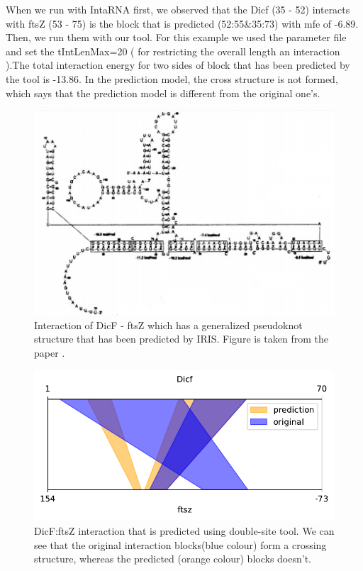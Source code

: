 \documentclass[twoside,a4paper]{report}
\numberwithin{equation}{section}
\begin{document}
	When we run with IntaRNA first, we observed that the Dicf (35 - 52) interacts with ftsZ (53 - 75) is the block that is predicted (52:55\&35:73) with mfe of -6.89. Then, we run them with our tool. For this example we used the parameter file and set the tIntLenMax=20 ( for restricting the overall length an interaction ).The total interaction energy for two sides of block that has been predicted by the tool is -13.86. In the prediction model, the cross structure is not formed, which says that the prediction model is different from the original one's. \\
	
		\begin{figure}[h!tb]
		\includegraphics[width=1.0\linewidth]{dicf}
		\centering
		\caption{ Interaction of DicF - ftsZ which has a generalized pseudoknot structure that has been predicted by IRIS.  Figure is taken from the paper \citep{pervouchine2004iris}. } 
		\label{fig:dicf}
	\end{figure}

\begin{figure}[h!tb]
	\centering
	\includegraphics[width=.4\linewidth]{rricomparison3}
	\caption{DicF:ftsZ interaction that is predicted using double-site tool. We can see that the original interaction blocks(blue colour) form a crossing structure, whereas the predicted (orange colour) blocks doesn't.}
	\label{fig:rricomparison3}
\end{figure}
\end{document}
